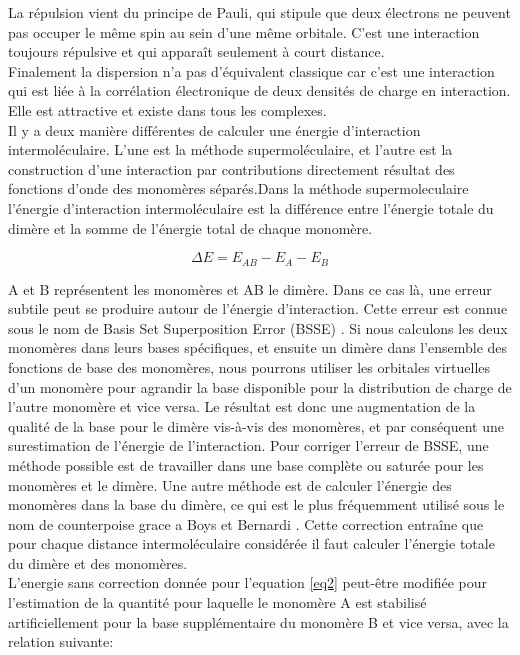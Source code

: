 La répulsion vient du principe de Pauli, qui stipule que deux électrons ne peuvent pas occuper le même spin au sein d’une même orbitale. C’est une interaction toujours répulsive et qui apparaît seulement à court distance.\\

Finalement la dispersion n’a pas d’équivalent classique car c’est une interaction qui est liée à la corrélation électronique de deux densités de charge en interaction. Elle est attractive et existe dans tous les complexes.\\

Il y a deux manière différentes de calculer une énergie d’interaction intermoléculaire. L’une est la méthode supermoléculaire, et l’autre est la construction d’une interaction par contributions directement résultat des fonctions d’onde des monomères séparés.Dans la méthode supermoleculaire l’énergie d’interaction intermoléculaire est la différence entre l’énergie totale du dimère et la somme de l’énergie total de chaque monomère.


\begin{equation}
\Delta E = E_{AB} - E_{A} - E_{B} \label{eq2}
\end{equation}

A et B représentent les monomères et AB le dimère. Dans ce cas là, une erreur subtile peut se produire autour de l’énergie d’interaction. Cette erreur est connue sous le nom de Basis Set Superposition Error (BSSE) \cite{sherrill2010counterpoise}. Si nous calculons les deux monomères dans leurs bases spécifiques, et ensuite un dimère dans l’ensemble des fonctions de base des monomères, nous pourrons utiliser les orbitales virtuelles d’un monomère pour agrandir la base disponible pour la distribution de charge de l’autre monomère et vice versa. Le résultat est donc une augmentation de la qualité de la base pour le dimère vis-à-vis des monomères, et par conséquent une surestimation de l’énergie de l’interaction. Pour corriger l’erreur de BSSE, une méthode possible est de travailler dans une base complète ou saturée pour les monomères et le dimère. Une autre méthode est de calculer l’énergie des monomères dans la base du dimère, ce qui est le plus fréquemment utilisé sous le nom de counterpoise grace a Boys et Bernardi \cite{boys1970calculation}. Cette correction entraîne que pour chaque distance intermoléculaire considérée il faut calculer l’énergie totale du dimère et des monomères.\\

L'energie sans correction donnée pour l'equation \ref{eq2}  peut-être modifiée pour l'estimation de la quantité pour laquelle le monomère A est stabilisé artificiellement pour la base supplémentaire du monomère B et vice versa, avec la relation suivante:

